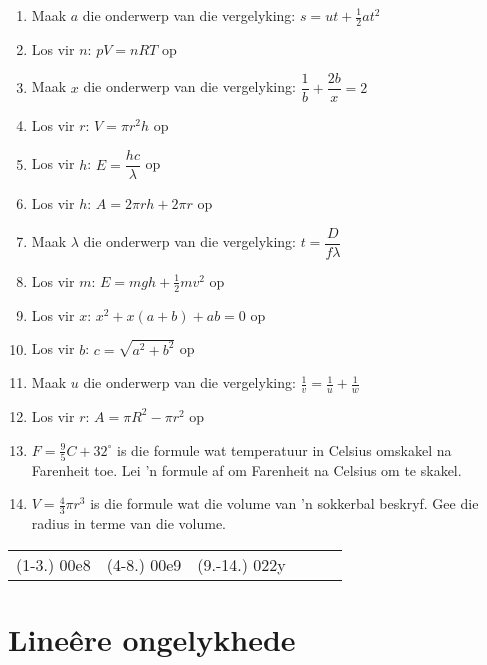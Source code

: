 \begin{exercises}{}
{
\begin{enumerate}[itemsep=5pt, label=\textbf{\arabic*}. ] 
\item Maak $a$ die onderwerp van die vergelyking: $s=ut+\frac{1}{2}at^{2}$
\item Los vir $n$: $pV=nRT$ op 
\item Maak $x$ die onderwerp van die vergelyking: $\dfrac{1}{b}+\dfrac{2b}{x}=2$
\item Los vir $r$: $V = \pi r^{2} h$ op
\item Los vir $h$: $E=\dfrac{hc}{\lambda}$ op
\item Los vir $h$: $A=2\pi rh + 2 \pi r$ op
\item Maak $\lambda$ die onderwerp van die vergelyking: $t=\dfrac{D}{f \lambda}$
\item Los vir $m$: $E=mgh + \frac{1}{2}mv^{2}$ op
\item Los vir $x$: $x^2+x(a+b)+ab=0$ op
\item Los vir $b$: $c=\sqrt{a^2+b^2}$ op
\item Maak $u$ die onderwerp van die vergelyking: $\frac{1}{v}=\frac{1}{u}+\frac{1}{w}$
\item Los vir $r$: $A=\pi R^2 -\pi r^2$ op 
\item $F=\frac{9}{5}C + 32^\circ$ is die formule wat temperatuur in Celsius omskakel na Farenheit toe. Lei 'n formule af om Farenheit na Celsius om te skakel.

\item $V=\frac{4}{3}\pi r^3$  is die formule wat die volume van 'n sokkerbal beskryf. Gee die radius in terme van die volume.
\end{enumerate}
\practiceinfo
\par 
\par \begin{tabular}[h]{cccccc}
(1-3.) 00e8&   (4-8.) 00e9 & (9.-14.) 022y\end{tabular}
}
\end{exercises}



\section{Lineêre ongelykhede}
\nopagebreak



